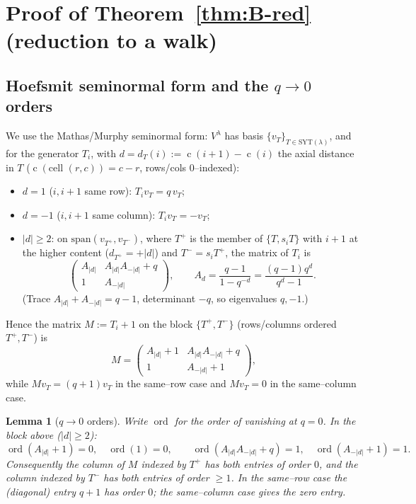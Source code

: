 \documentclass[11pt]{article}
\newtheorem{lemma}[theorem]{Lemma}
\theoremstyle{definition}
\DeclareMathOperator{\ord}{ord}
\DeclareMathOperator{\content}{c}
\newcommand{\SYT}{\mathrm{SYT}}
\begin{document}
\section{Proof of Theorem~\ref{thm:B-red} (reduction to a walk)}\label{sec:reduction}

\subsection{Hoefsmit seminormal form and the $q\to0$ orders}
We use the Mathas/Murphy seminormal form: $V^\lambda$ has basis
$\{v_T\}_{T\in\SYT(\lambda)}$, and for the generator $T_i$, with
$d=d_T(i):=\content(i{+}1)-\content(i)$ the axial distance in $T$
($\content(\text{cell }(r,c))=c-r$, rows/cols $0$--indexed):
\begin{itemize}[nosep]
\item $d=1$ ($i,i{+}1$ same row): $T_i v_T=q\,v_T$;
\item $d=-1$ ($i,i{+}1$ same column): $T_i v_T=-v_T$;
\item $|d|\ge2$: on $\mathrm{span}(v_{T^+},v_{T^-})$, where $T^+$ is the
member of $\{T,s_iT\}$ with $i{+}1$ at the higher content
($d_{T^+}=+|d|$) and $T^-=s_iT^+$, the matrix of $T_i$ is
\[
\begin{pmatrix}A_{|d|} & A_{|d|}A_{-|d|}+q\\[2pt] 1 & A_{-|d|}\end{pmatrix},
\qquad A_d=\frac{q-1}{1-q^{-d}}=\frac{(q-1)q^{d}}{q^{d}-1}.
\]
(Trace $A_{|d|}+A_{-|d|}=q-1$, determinant $-q$, so eigenvalues $q,-1$.)
\end{itemize}
Hence the matrix $M:=T_i+1$ on the block $\{T^+,T^-\}$ (rows/columns ordered
$T^+,T^-$) is
\[
M=\begin{pmatrix}A_{|d|}+1 & A_{|d|}A_{-|d|}+q\\[2pt] 1 & A_{-|d|}+1\end{pmatrix},
\]
while $M v_T=(q+1)v_T$ in the same--row case and $Mv_T=0$ in the
same--column case.

\begin{lemma}[$q\to0$ orders]\label{lem:orders}
Write $\ord$ for the order of vanishing at $q=0$. In the block above
($|d|\ge2$):
\[
\ord(A_{|d|}+1)=0,\quad \ord(1)=0,\qquad
\ord(A_{|d|}A_{-|d|}+q)=1,\quad \ord(A_{-|d|}+1)=1.
\]
Consequently the column of $M$ indexed by $T^+$ has both entries of order $0$,
and the column indexed by $T^-$ has both entries of order $\ge1$. In the
same--row case the (diagonal) entry $q+1$ has order $0$; the same--column case
gives the zero entry.
\end{lemma}
\end{document}
